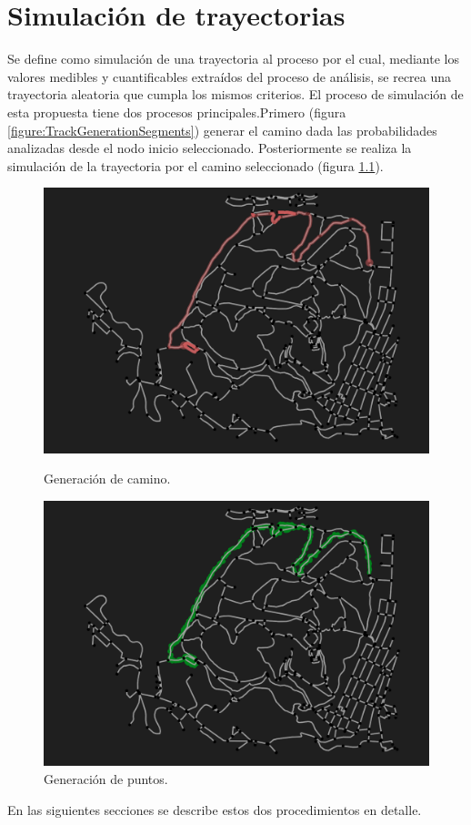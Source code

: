 
\chapter{Simulación de trayectorias}
Se define como simulación de una trayectoria al proceso por el cual, mediante los valores 
medibles y cuantificables extraídos del proceso de análisis, se recrea una trayectoria aleatoria que 
cumpla los mismos criterios. El proceso de simulación de esta propuesta tiene dos procesos 
principales.Primero (figura  \ref{figure:TrackGenerationSegments}) generar el camino dada las 
probabilidades analizadas desde el nodo inicio seleccionado. Posteriormente se realiza la simulación 
de la trayectoria por el camino seleccionado (figura \ref{figure:TrackGenerationPoints}).
\begin{figure}[!htb]
\begin{minipage}{0.48\textwidth}
\centering
\includegraphics[width=1\textwidth]{./Imagenes/TrackGenerationSegments.png}
\caption{Generación de camino.}
\label{figure:TrackGenerationSegments}
\end{minipage}\hfill
\begin{minipage}{0.48\textwidth}
\centering
\includegraphics[width=1\textwidth]{./Imagenes/TrackGenerationPoints.png}
\caption{Generación de puntos.}
\label{figure:TrackGenerationPoints}
\end{minipage}
\end{figure}
\newpage
En las siguientes secciones se describe estos dos procedimientos en detalle.

